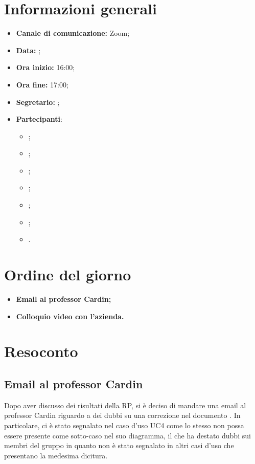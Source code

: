 \section{Informazioni generali}

\begin{itemize}

    \item \textbf{Canale di comunicazione:} Zoom;

    \item \textbf{Data:} \DataMeeting{};

    \item \textbf{Ora inizio:} 16:00;

    \item \textbf{Ora fine:} 17:00;

    \item \textbf{Segretario:} \ACapoRedazione{};

    \item \textbf{Partecipanti}:
        \begin{itemize}
            \item \Daniele{};
            \item \Davide{};
            \item \Francesco{};
            \item \Giosue{};
            \item \Lucrezia{};
            \item \Matteo{};
            \item \Tommaso{}.
        \end{itemize}
\end{itemize}

\section{Ordine del giorno}

\begin{itemize}
    \item\textbf{Email al professor Cardin;}
    \item\textbf{Colloquio video con l'azienda.}
\end{itemize}
\newpage


\section{Resoconto}

\subsection{Email al professor Cardin}
Dopo aver discusso dei risultati della RP, si è deciso di mandare una email al professor Cardin riguardo a dei dubbi su una correzione nel documento \AdR{}.  In particolare, ci è stato segnalato nel caso d'uso UC4 come lo stesso non possa essere presente come sotto-caso nel suo diagramma, il che ha destato dubbi sui membri del gruppo in quanto non è stato segnalato in altri casi d'uso che presentano la medesima dicitura.

